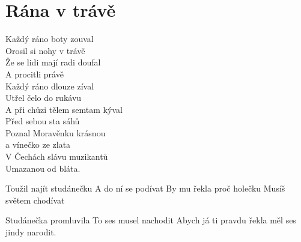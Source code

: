 \section{Rána v trávě}
\onehalfspacing

{}Každý ráno boty zouval\\
Orosil si nohy v trávě\\
Že se lidi mají radi doufal\\
A procitli právě\\
Každý ráno dlouze zíval\\
Utřel čelo do rukávu\\
A při chůzi tělem semtam kýval\\
Před sebou sta sáhů\\

Poznal Moravěnku krásnou\\
a vínečko ze zlata\\
V Čechách slávu muzikantů\\
Umazanou od bláta. \\

\begin{multicols}{2}
\singlespacing


\sloka{}

Toužil najít studánečku
A do ní se podívat
By mu řekla proč holečku
Musíš světem chodívat


\sloka{}

Studánečka promluvila
To ses musel nachodit
Abych já ti pravdu řekla
měl ses jindy narodit.


\end{multicols}